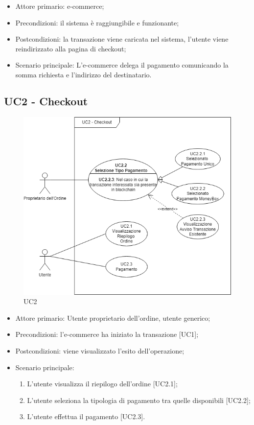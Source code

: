 \begin{itemize}
    \item Attore primario: e-commerce\glo{};
    \item Precondizioni: il sistema è raggiungibile e funzionante;
    \item Postcondizioni: la transazione viene caricata nel sistema, l'utente viene reindirizzato alla pagina di checkout;
    \item Scenario principale: L'e-commerce\glo{} delega il pagamento comunicando la somma richiesta e l'indirizzo del destinatario.
\end{itemize}

\subsection{UC2 - Checkout}\label{subsection: UC2}

\begin{figure}[H]
    \centering
    \includegraphics[scale=0.7]{immagini/UC2.png}
    \caption{UC2}
\end{figure}

\begin{itemize}
    \item Attore primario: Utente proprietario dell'ordine, utente generico;
    \item Precondizioni: l'e-commerce\glo{} ha iniziato la transazione [UC1];
    \item Postcondizioni: viene visualizzato l'esito dell'operazione;
    \item Scenario principale:
    \begin{enumerate}
        \item L'utente visualizza il riepilogo dell'ordine [UC2.1];
        \item L'utente seleziona la tipologia di pagamento tra quelle disponibili [UC2.2];
        \item L'utente effettua il pagamento [UC2.3].
    \end{enumerate}
\end{itemize}

